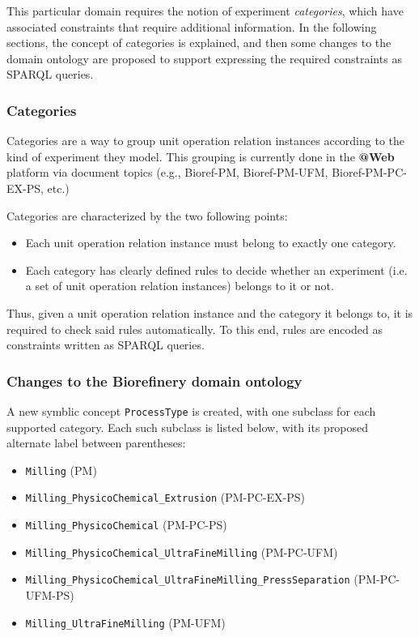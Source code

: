 \documentclass[a4paper, 10pt]{article}
\makeatletter
\newcommand{\atweb}{\textbf{@Web}\xspace}
\newcommand{\code}[1]{\texttt{#1}}
\makeatother
\begin{document}
This particular domain requires the notion of experiment \textit{categories},
which have associated constraints that require additional information. In the
following sections, the concept of categories is explained, and then some
changes to the domain ontology are proposed to support expressing the required
constraints as SPARQL queries.

\subsubsection{Categories}

Categories are a way to group unit operation relation instances according to
the kind of experiment they model. This grouping is currently done in the
\atweb platform via document topics (e.g., Bioref-PM, Bioref-PM-UFM,
Bioref-PM-PC-EX-PS, etc.)

Categories are characterized by the two following points:

\begin{itemize}
  \item Each unit operation relation instance must belong to exactly one
    category.

  \item Each category has clearly defined rules to decide whether an experiment
    (i.e. a set of unit operation relation instances) belongs to it or not.
\end{itemize}

Thus, given a unit operation relation instance and the category it belongs to,
it is required to check said rules automatically. To this end, rules are
encoded as constraints written as SPARQL queries.

\subsubsection{Changes to the Biorefinery domain ontology}

A new symblic concept \code{ProcessType} is created, with one subclass for each
supported category. Each such subclass is listed below, with its proposed
alternate label between parentheses:

\begin{itemize}
  \item \code{Milling} (PM)
  \item \code{Milling\_PhysicoChemical\_Extrusion} (PM-PC-EX-PS)
  \item \code{Milling\_PhysicoChemical} (PM-PC-PS)
  \item \code{Milling\_PhysicoChemical\_UltraFineMilling} (PM-PC-UFM)
  \item \code{Milling\_PhysicoChemical\_UltraFineMilling\_PressSeparation}
  (PM-PC-UFM-PS)
  \item \code{Milling\_UltraFineMilling} (PM-UFM)
\end{itemize}
\end{document}
